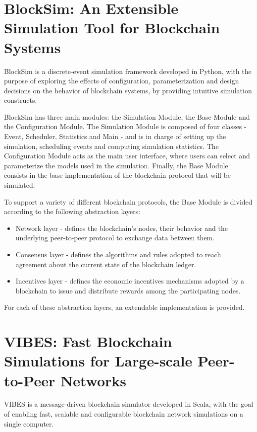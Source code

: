 \section{BlockSim: An Extensible Simulation Tool for Blockchain Systems}
\label{sec:blocksim2}

BlockSim \cite{blocksim2} is a discrete-event simulation framework developed in Python, with the purpose of exploring the effects of configuration, parameterization and design decisions on the behavior of blockchain systems, by providing intuitive simulation constructs.

BlockSim has three main modules: the Simulation Module, the Base Module and the Configuration Module. The Simulation Module is composed of four classes - Event, Scheduler, Statistics and Main - and is in charge of setting up the simulation, scheduling events and computing simulation statistics. The Configuration Module acts as the main user interface, where users can select and parameterize the models used in the simulation. Finally, the Base Module consists in the base implementation of the blockchain protocol that will be simulated.

To support a variety of different blockchain protocols, the Base Module is divided according to the following abstraction layers:

\begin{itemize}
	\item Network layer - defines the blockchain’s nodes, their behavior and the underlying peer-to-peer protocol to exchange data between them.
	\item Consensus layer - defines the algorithms and rules adopted to reach agreement about the current state of the blockchain ledger.
	\item Incentives layer - defines the economic incentives mechanisms adopted by a blockchain to issue and distribute rewards among the participating nodes.
\end{itemize}

For each of these abstraction layers, an extendable implementation is provided.


\section{VIBES: Fast Blockchain Simulations for Large-scale Peer-to-Peer Networks}
\label{sec:vibes}

VIBES \cite{vibes} is a message-driven blockchain simulator developed in Scala, with the goal of enabling fast, scalable and configurable blockchain network simulations on a single computer.

